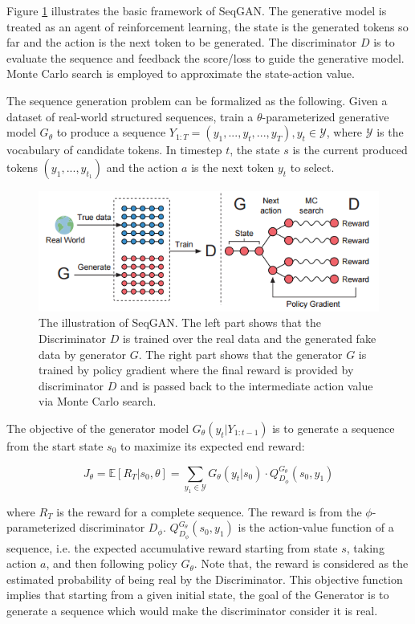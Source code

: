 \documentclass[conference]{IEEEtran}
\begin{document}
Figure \ref{fig:seqgan} illustrates the basic framework of SeqGAN. The generative model is treated as an agent of reinforcement learning, the state is the generated tokens so far and the action is the next token to be generated. The discriminator $ D $ is to evaluate the sequence and feedback the score/loss to guide the generative model. Monte Carlo search is employed to approximate the state-action value.

The sequence generation problem can be formalized as the following. Given a dataset of real-world structured sequences, train a $ \theta $-parameterized generative model $ G_{\theta} $ to produce a sequence $ Y_{1:T} = (y_1, ..., y_t,...,y_T), y_t \in \mathcal{Y} $, where $ \mathcal{Y} $ is the vocabulary of candidate tokens. In timestep $ t $, the state $ s $ is the current produced tokens $ (y_1,...,y_{t_1}) $ and the action $ a $ is the next token $ y_t $ to select. 

\begin{figure}
	\centering
	\includegraphics[width=\columnwidth]{seqgan.png}
	\caption{The illustration of SeqGAN. The left part shows that the Discriminator $ D $ is trained over the real data and the generated fake data by generator $ G $. The right part shows that the generator $ G $ is trained by policy gradient where the final reward is provided by discriminator $ D $ and is passed back to the intermediate action value via Monte Carlo search.\cite{yu2016seqgan}}	
	\label{fig:seqgan}
\end{figure}

The objective of the generator model $ G_{\theta}(y_t|Y_{1:t-1}) $ is to generate a sequence from the start state $ s_0 $ to maximize its expected end reward:

\begin{equation} \label{weight}
	J_{\theta} = \mathbb{E}[R_T|s_0, \theta] = \sum_{y_1 \in \mathcal{Y}} G_{\theta}(y_t|s_0) \cdot Q^{G_{\theta}}_{D_\phi}(s_0,y_1)
\end{equation}

where $ R_T $ is the reward for a complete sequence. The reward is from the $ \phi $-parameterized discriminator $ D_{\phi} $. $ Q^{G_{\theta}}_{D_\phi}(s_0,y_1) $ is the action-value function of a sequence, i.e. the expected accumulative reward starting from state $ s $, taking action $ a $, and then following policy $ G_{\theta} $. Note that, the reward is considered as the estimated probability of being real by the Discriminator. This objective function implies that starting from a given initial state, the goal of the Generator is to generate a sequence which would make the discriminator consider it is real.
\end{document}
